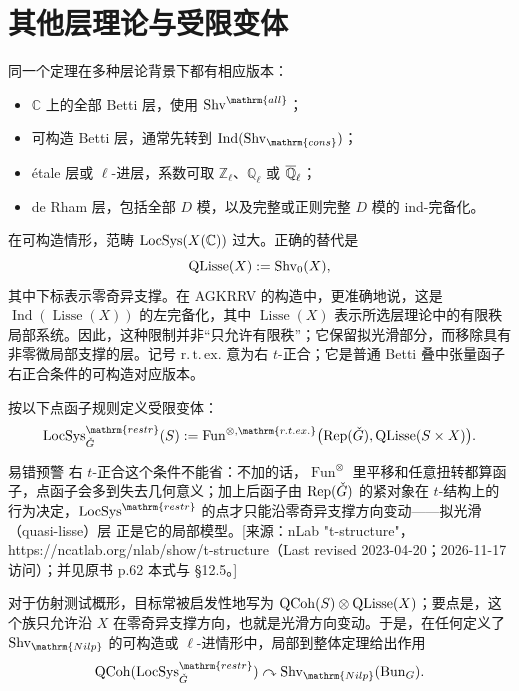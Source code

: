\section{其他层理论与受限变体}\label{sec:12.5}
同一个定理在多种层论背景下都有相应版本：
\begin{itemize}
\item $\mathbb C$ 上的全部 Betti 层，使用 $\Shv^{\mathrm{all}}$；
\item 可构造 Betti 层，通常先转到 $\operatorname{Ind}(\Shv_{\mathrm{cons}})$；
\item étale 层或 $\ell$-进层，系数可取 $\mathbb Z_\ell$、$\mathbb Q_\ell$ 或 $\overline{\mathbb{Q}}_{\ell}$；
\item de Rham 层，包括全部 $D$ 模，以及完整或正则完整 $D$ 模的 ind-完备化。
\end{itemize}
在可构造情形，范畴 $\operatorname{LocSys}(X(\mathbb C))$ 过大。正确的替代是
\[\operatorname{QLisse}(X):=\operatorname{Shv}_0(X),\]
其中下标表示零奇异支撑。在 AGKRRV 的构造\cite{AGK20a}中，更准确地说，这是 $\operatorname{Ind}(\operatorname{Lisse}(X))$ 的左完备化，其中 $\operatorname{Lisse}(X)$ 表示所选层理论中的有限秩局部系统。因此，这种限制并非“只允许有限秩”；它保留拟光滑部分，而移除具有非零微局部支撑的层。记号 $\mathrm{r.\,t.\,ex.}$ 意为右 $t$-正合；它是普通 Betti 叠中张量函子右正合条件的可构造对应版本。
\begin{definition*}{}

按以下点函子规则定义受限变体：
\[\LocSys^{\mathrm{restr}}_{\checkG}(S):=\operatorname{Fun}^{\otimes,\mathrm{r.t.ex.}}\bigl(\Rep(\checkG),\operatorname{QLisse}(S\times X)\bigr).\]

\begin{transnote}{易错预警}
右 $t$-正合这个条件不能省：不加的话，$\operatorname{Fun}^{\otimes}$ 里平移和任意扭转都算函子，点函子会多到失去几何意义；加上后函子由 $\operatorname{Rep}(\check G)$ 的紧对象在 $t$-结构上的行为决定，$\LocSys^{\mathrm{restr}}$ 的点才只能沿零奇异支撑方向变动——拟光滑（quasi-lisse）层 正是它的局部模型。[来源：nLab "t-structure"，https://ncatlab.org/nlab/show/t-structure（Last revised 2023-04-20；2026-11-17 访问）；并见原书 p.62 本式与 §12.5。]
\end{transnote}
\end{definition*}
对于仿射测试概形，目标常被启发性地写为 $\operatorname{QCoh}(S)\otimes\operatorname{QLisse}(X)$；要点是，这个族只允许沿 $X$ 在零奇异支撑方向，也就是光滑方向变动。于是，在任何定义了 $\Shv_{\mathrm{Nilp}}$ 的可构造或 $\ell$-进情形中，局部到整体定理给出作用
\[\QCoh(\LocSys^{\mathrm{restr}}_{\checkG})\curvearrowright\Shv_{\mathrm{Nilp}}(\Bun_G).\]

